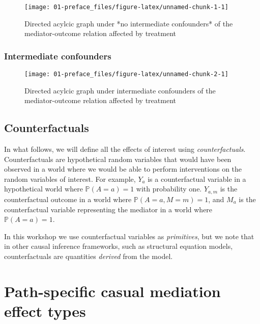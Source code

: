\documentclass[
  12pt, krantz2,
]{book}
\theoremstyle{definition}
\theoremstyle{definition}
\theoremstyle{definition}
\renewcommand{\P}{\mathbb{P}}
\newcommand{\1}{\mathbbm{1}}
\begin{document}
\begin{figure}

{\centering \texttt{[image: 01-preface\_files/figure-latex/unnamed-chunk-1-1]} 

}

\caption{Directed acylcic graph under *no intermediate confounders* of the mediator-outcome relation affected by treatment}\label{fig:unnamed-chunk-1}
\end{figure}

\hypertarget{intermediate-confounders}{%
\subsection{Intermediate confounders}\label{intermediate-confounders}}

\begin{figure}

{\centering \texttt{[image: 01-preface\_files/figure-latex/unnamed-chunk-2-1]} 

}

\caption{Directed acylcic graph under intermediate confounders of the mediator-outcome relation affected by treatment}\label{fig:unnamed-chunk-2}
\end{figure}

\hypertarget{counterfactuals}{%
\section{Counterfactuals}\label{counterfactuals}}

In what follows, we will define all the effects of interest using
\emph{counterfactuals}. Counterfactuals are hypothetical random variables
that would have been observed in a world where we would be able to
perform interventions on the random variables of interest. For
example, \(Y_a\) is a counterfactual variable in a hypothetical world
where \(\P(A=a)=1\) with probability one. \(Y_{a,m}\) is the
counterfactual outcome in a world where \(\P(A=a,M=m)=1\), and \(M_a\) is
the counterfactual variable representing the mediator in a world where
\(\P(A=a)=1\).

In this workshop we use counterfactual variables as \emph{primitives}, but
we note that in other causal inference frameworks, such as structural
equation models, counterfactuals are quantities \emph{derived} from the
model.

\hypertarget{estimands}{%
\chapter{Path-specific casual mediation effect types}\label{estimands}}
\end{document}
